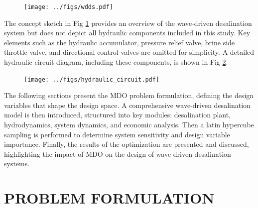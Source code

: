 \documentclass[twocolumn,10pt]{asme2e}
\begin{document}
\begin{figure}[b!]
    \texttt{[image: ../figs/wdds.pdf]}
    \label{fig:WDDS}
\end{figure}

The concept sketch in Fig \ref{fig:WDDS} provides an overview of the wave-driven desalination system but does not depict all hydraulic components included in this study. Key elements such as the hydraulic accumulator, pressure relief valve, brine side throttle valve, and directional control valves are omitted for simplicity. A detailed hydraulic circuit diagram, including these components, is shown in Fig \ref{fig:hydraulics}.

\begin{figure}[t!]
    \centering
    \texttt{[image: ../figs/hydraulic\_circuit.pdf]}
    \label{fig:hydraulics}
\end{figure}

The following sections present the MDO problem formulation, defining the design variables that shape the design space. A comprehensive wave-driven desalination model is then introduced, structured into key modules: desalination plant, hydrodynamics, system dynamics, and economic analysis. Then a latin hypercube sampling is performed to determine system sensitivity and design variable importance. Finally, the results of the optimization are presented and discussed, highlighting the impact of MDO on the design of wave-driven desalination systems.

\section{PROBLEM FORMULATION}
\end{document}
